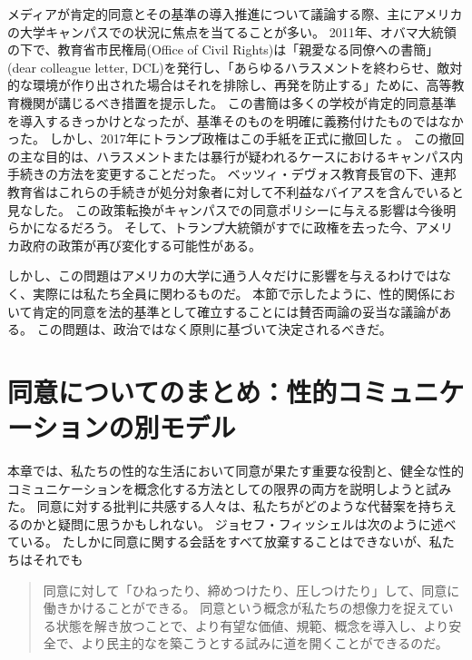 \documentclass[paper=a4,book,openany]{jlreq}
\newcommand{\ig}[1]{}           %
\begin{document}
メディアが肯定的同意とその基準の導入推進について議論する際、主にアメリカの大学キャンパスでの状況に焦点を当てることが多い。
2011年、オバマ大統領の下で、教育省市民権局(Office of Civil Rights)は「親愛なる同僚への書簡」(dear colleague letter, DCL)を発行し、「あらゆるハラスメントを終わらせ、敵対的な環境が作り出された場合はそれを排除し、再発を防止する」ために、高等教育機関が講じるべき措置を提示した。
この書簡は多くの学校が肯定的同意基準を導入するきっかけとなったが、基準そのものを明確に義務付けたものではなかった。
しかし、2017年にトランプ政権はこの手紙を正式に撤回した
\citep{melnick20:_analy_depar_educat_final_title}。
この撤回の主な目的は、ハラスメントまたは暴行が疑われるケースにおけるキャンパス内手続きの方法を変更することだった。
ベッツィ・デヴォス\ig{Betsy DeVos}教育長官の下、連邦教育省はこれらの手続きが処分対象者に対して不利益なバイアスを含んでいると見なした。
この政策転換がキャンパスでの同意ポリシーに与える影響は今後明らかになるだろう。
そして、トランプ大統領がすでに政権を去った今、アメリカ政府の政策が再び変化する可能性がある。

しかし、この問題はアメリカの大学に通う人々だけに影響を与えるわけではなく、実際には私たち全員に関わるものだ。
本節で示したように、性的関係において肯定的同意を法的基準として確立することには賛否両論の妥当な議論がある。
この問題は、政治ではなく原則に基づいて決定されるべきだ。

\section{同意についてのまとめ：性的コミュニケーションの別モデル}

本章では、私たちの性的な生活において同意が果たす重要な役割と、健全な性的コミュニケーションを概念化する方法としての限界の両方を説明しようと試みた。
同意に対する批判に共感する人々は、私たちがどのような代替案を持ちえるのかと疑問に思うかもしれない。
ジョセフ・フィッシェル\ig{Joseph Fischel}は次のように述べている。
たしかに同意に関する会話をすべて放棄することはできないが、私たちはそれでも

\begin{quote}
同意に対して「ひねったり、締めつけたり、圧しつけたり」して、同意に働きかけることができる。
同意という概念が私たちの想像力を捉えている状態を解き放つことで、より有望な価値、規範、概念を導入し、より安全で、より民主的なを築こうとする試みに道を開くことができるのだ。
\citep[p.3]{fischel18:screwconsent}
\end{quote}
\end{document}
